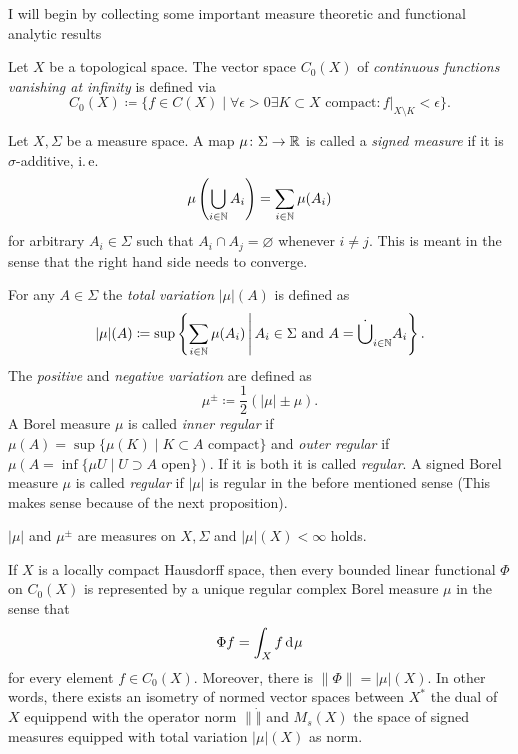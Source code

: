 I will begin by collecting some important measure theoretic and functional analytic results

\begin{defin}
  Let \(X\) be a topological space. The vector space \(C_0(X)\) of \emph{continuous functions vanishing at infinity} is defined via
  \[
    C_0(X) \coloneqq \{f \in C(X) \mid \forall \epsilon > 0 \exists K \subset X \text{ compact}\colon f|_{X\setminus K} < \epsilon\}.
  \]
\end{defin}

\begin{defin}
  Let \(X, \Sigma\) be a measure space. A map \(\mu \colon \Sigma \to \mathbb{R}\) is called a \emph{signed measure} if it is \(\sigma\)-additive, i.\,e.
  \[
    \mu\left(\bigcup_{i \in \mathbb{N}}A_i \right) = \sum_{i \in \mathbb{N}} \mu(A_i)
  \]
  for arbitrary \(A_i \in \Sigma\) such that \(A_i \cap A_j = \varnothing\) whenever \(i \neq j\). This is meant in the sense that the right hand side needs to converge.

  For any \(A \in \Sigma\) the \emph{total variation} \(|\mu|(A)\) is defined as
  \[
    |\mu|(A) \coloneqq \sup \left\{\sum_{i \in \mathbb{N}} \mu(A_i) \,\middle|\, A_i \in \Sigma \text{ and } A = \dot \bigcup_{i \in \mathbb{N}} A_i \right \}.
  \]
  The \emph{positive} and \emph{negative variation} are defined as
  \[
    \mu^\pm \coloneqq \frac12 (|\mu| \pm \mu).
  \]
  A Borel measure \(\mu\) is called \emph{inner regular} if \(\mu(A) = \sup \{ \mu(K) \mid K \subset A \text{ compact}\}\) and \emph{outer regular} if \(\mu(A = \inf \{ \mu{U} \mid U \supset A \text{ open}\})\). If it is both it is called \emph{regular}. A signed Borel measure \(\mu\) is called \emph{regular} if \(|\mu|\) is regular in the before mentioned sense (This makes sense because of the next proposition).
\end{defin}

\begin{prop}
  \(|\mu|\) and \(\mu^\pm\) are measures on \(X, \Sigma\) and \(|\mu|(X) < \infty\) holds.
\end{prop}

\begin{thm}
  If \(X\) is a locally compact Hausdorff space, then every bounded linear functional \(\Phi\) on \(C_0(X)\) is represented by a unique regular complex Borel measure \(\mu\) in the sense that \[
    \Phi f = \int_X f \d\mu
  \]
  for every element \(f \in C_0(X)\). Moreover, there is \(\|\Phi\| = |\mu|(X)\). In other words, there exists an isometry of normed vector spaces between \(X^\ast\) the dual of \(X\) equippend with the operator norm \(\|\dot \|\) and \(M_{s}(X)\) the space of signed measures equipped with total variation \(|\mu|(X)\) as norm.
\end{thm}

